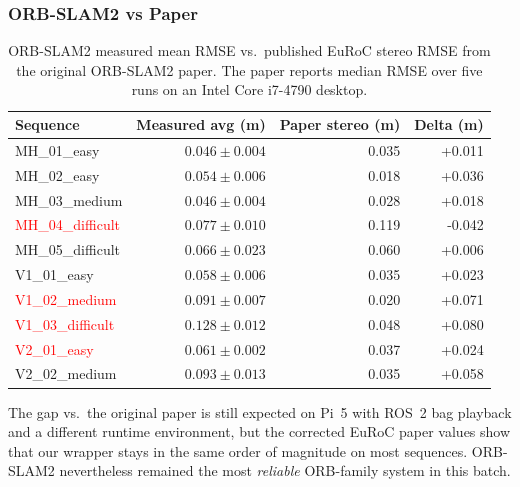 \documentclass[11pt]{article}
\begin{document}
\subsubsection{ORB-SLAM2 vs Paper}

\begin{table}[H]
\centering
\small
\caption{ORB-SLAM2 measured mean RMSE vs.\ published EuRoC stereo RMSE from the original ORB-SLAM2 paper. The paper reports median RMSE over five runs on an Intel Core i7-4790 desktop.}
\label{tab:orbslam2_vs_paper}
\begin{tabular}{lrrr}
\toprule
Sequence & Measured avg (m) & Paper stereo (m) & Delta (m) \\
\midrule
MH\_01\_easy       & $0.046 \pm 0.004$ & 0.035 & +0.011 \\
MH\_02\_easy       & $0.054 \pm 0.006$ & 0.018 & +0.036 \\
MH\_03\_medium     & $0.046 \pm 0.004$ & 0.028 & +0.018 \\
\textcolor{red}{MH\_04\_difficult} & $0.077 \pm 0.010$ & 0.119 & -0.042 \\
MH\_05\_difficult  & $0.066 \pm 0.023$ & 0.060 & +0.006 \\
V1\_01\_easy       & $0.058 \pm 0.006$ & 0.035 & +0.023 \\
\textcolor{red}{V1\_02\_medium}   & $0.091 \pm 0.007$ & 0.020 & +0.071 \\
\textcolor{red}{V1\_03\_difficult}& $0.128 \pm 0.012$ & 0.048 & +0.080 \\
\textcolor{red}{V2\_01\_easy}     & $0.061 \pm 0.002$ & 0.037 & +0.024 \\
V2\_02\_medium     & $0.093 \pm 0.013$ & 0.035 & +0.058 \\
\bottomrule
\end{tabular}
\end{table}

The gap vs.\ the original paper is still expected on Pi~5 with ROS~2 bag playback and a different runtime environment, but the corrected EuRoC paper values show that our wrapper stays in the same order of magnitude on most sequences. ORB-SLAM2 nevertheless remained the most \emph{reliable} ORB-family system in this batch.

\end{document}
